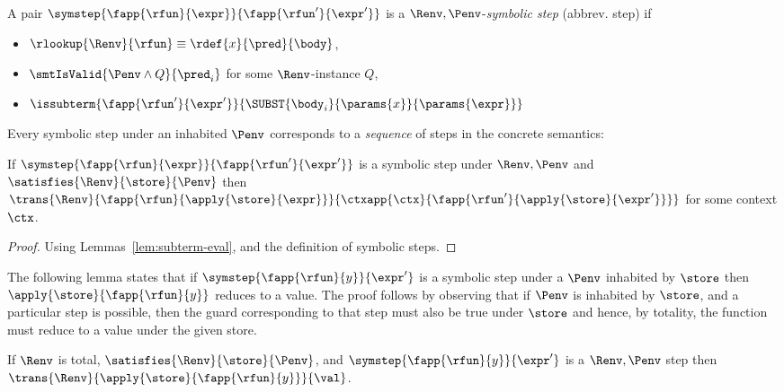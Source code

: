 %
A pair
$\symstep{\fapp{\rfun}{\expr}}{\fapp{\rfun'}{\expr'}}$
is a
$\Renv,\Penv$-\emph{symbolic step} (abbrev. step)
if
%
\begin{itemize}
  \item $\rlookup{\Renv}{\rfun} \equiv \rdef{x}{\pred}{\body}$,
  \item $\smtIsValid{\Penv \wedge Q}{\pred_i}$ for some $\Renv$-instance $Q$,
  \item $\issubterm{\fapp{\rfun'}{\expr'}}{\SUBST{\body_i}{\params{x}}{\params{\expr}}}$
\end{itemize}

%
Every symbolic step under an inhabited $\Penv$ corresponds
to a \emph{sequence} of steps in the concrete semantics:

\begin{lemma}\label{lem:step-reductions}
If   $\symstep{\fapp{\rfun}{\expr}}{\fapp{\rfun'}{\expr'}}$
     is a symbolic step under $\Renv, \Penv$
     and
     $\satisfies{\Renv}{\store}{\Penv}$
then $\trans{\Renv}
            {\fapp{\rfun}{\apply{\store}{\expr}}}
            {\ctxapp{\ctx}{\fapp{\rfun'}{\apply{\store}{\expr'}}}}$
for some context $\ctx$.
\end{lemma}

\begin{proof}
Using Lemmas~\ref{lem:subterm-eval}, \label{lem:smt-approx}
and the definition of symbolic steps.
\end{proof}

%
The following lemma states that if
$\symstep{\fapp{\rfun}{y}}{\expr'}$
is a symbolic step under a $\Penv$
inhabited by $\store$ then
$\apply{\store}{\fapp{\rfun}{y}}$
reduces to a value.
%
The proof follows by observing that if $\Penv$
is inhabited by $\store$, and a particular step
is possible, then the guard corresponding to that
step must also be true under $\store$ and hence,
by totality, the function must reduce to a value
under the given store.

\begin{lemma}\label{lem:step-value}
If $\Renv$ is total,
   $\satisfies{\Renv}{\store}{\Penv}$, and
   $\symstep{\fapp{\rfun}{y}}{\expr'}$ is a $\Renv,\Penv$ step
then $\trans{\Renv}{\apply{\store}{\fapp{\rfun}{y}}}{\val}$.
\end{lemma}


